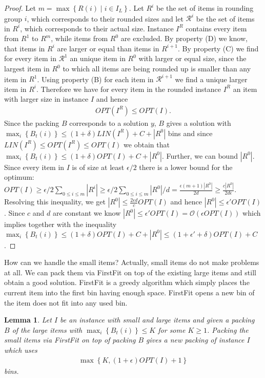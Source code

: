 \documentclass[a4paper,11pt]{article}
\newcommand{\menge}[1]{\left\{#1\right\}}
\newtheorem{lem}[thm]{Lemma}
\begin{document}
\begin{proof}
	Let $m = \max\menge{R(i) \mid i \in I_L}$. Let $R^i$ be the set of items in rounding group $i$, which corresponds
	to their rounded sizes and let $\mathcal{R}^i$ be the set of items in $R^i$, which corresponds to their actual
	size. Instance $I^R$ contains every item from $R^1$ to $R^m$, 
	while items from $R^0$ are excluded.
	By property (D) we know, that items in $R^i$ are larger or equal than items in $R^{i+1}$.
	By property (C) we find for every item in $\mathcal{R}^1$ an unique item in $R^0$ with larger or equal size, 
	since the largest item
	in $R^0$ to which all items are being rounded up is smaller than any item in $R^1$.
	Using property (B) for each item in $\mathcal{R}^{i+1}$ we find a unique larger item in $R^i$.
	Therefore we have for every item in the rounded instance $I^R$ an item with larger size in instance $I$ and hence
	\begin{align*}
	\mathit{OPT(I^R)} \leq \mathit{OPT(I)}.
   \end{align*}
   Since the packing $B$ corresponds to a solution $y$, $B$ gives a solution with 
   $\max_{i}\menge{B_{t}(i)} \leq (1+\delta)\mathit{LIN}(I^R)+C+|R^0|$ bins and since $\mathit{LIN}(I^R) \leq \mathit{OPT(I^R)} \leq \mathit{OPT(I)}$
   we obtain that $\max_{i}\menge{B_{t}(i)} \leq  (1+\delta)\mathit{OPT}(I)+C+|R^0|$. Further, we can bound $|R^0|$.
   Since every item in $I$ is of size at least $\epsilon/2$ there is a lower bound for the optimum:
   $\mathit{OPT(I)} \geq \epsilon/2 \sum_{0 \leq i \leq m} |R^i| \geq \epsilon/2 \sum_{0 \leq i \leq m} |R^0|/d
   = \frac{\epsilon (m+1) |R^0|}{2 d} \geq \frac{c |R^0|}{2 d \epsilon}$.
   Resolving this inequality, we get $|R^0| \leq \frac{2 \epsilon d }{c} \mathit{OPT}(I)$ and hence 
	$|R^0| \leq \epsilon' \mathit{OPT}(I)$. Since
   $c$ and $d$ are constant we know $|R^0| \leq \epsilon' \mathit{OPT}(I) = \mathcal{O}(\epsilon \mathit{OPT(I)})$ which implies together with
   the inequality $\max_{i}\menge{B_{t}(i)} \leq (1+\delta)\mathit{OPT}(I)+C+|R^0| \leq 
   (1+\epsilon'+\delta)\mathit{OPT}(I)+C$.
\end{proof}
How can we handle the small items? Actually, small items do not make problems at all. We can pack them via 
FirstFit \cite{coffman1984approximation}
on top of the existing large items and still obtain a good solution. FirstFit is a greedy algorithm which simply places
the current item into the first bin having enough space. FirstFit opens a new bin of the item does not fit into any
used bin.
\begin{lem}\label{lem11} \cite{de1981bin}
	Let $I$ be an instance with small and large items and given a packing $B$ of the large items with
	$\max_{i}\menge{B_{t}(i)} \leq K$ for some $K \geq 1$.
  Packing the small items via FirstFit on top of packing $B$ gives a new packing of instance $I$ which uses
  \begin{align*}
    \max \menge{K,(1+\epsilon)\mathit{OPT}(I)+1}
  \end{align*}
  bins.
\end{lem}
\end{document}
